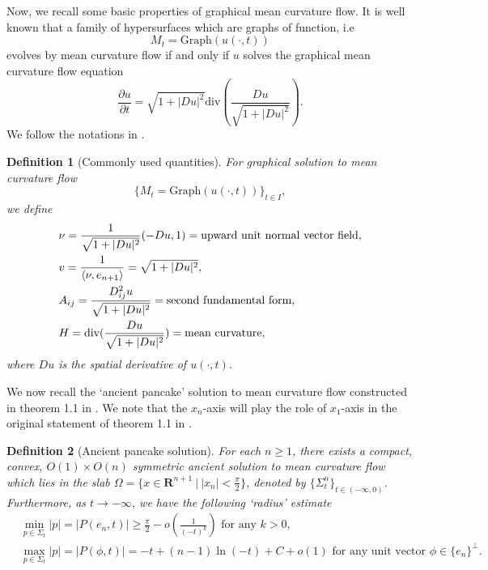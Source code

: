 \documentclass[pdflatex,sn-mathphys-num]{sn-jnl}%
\newtheorem{definition}{Definition}[section]
\begin{document}
Now, we recall some basic properties of graphical mean curvature flow. It is well known that a family of hypersurfaces which are graphs of function, i.e
\begin{equation}
    M_t = \text{Graph}(u(\cdot, t))
\end{equation}
evolves by mean curvature flow if and only if $u$ solves the graphical mean curvature flow equation
\begin{equation}
    \frac{\partial u}{\partial t} = \sqrt{1 + |Du|^2}\text{div}(\frac{Du}{\sqrt{1 + |Du|^2}}).
\end{equation}
We follow the notations in \cite{eckerhuisken}.
\begin{definition}[Commonly used quantities]\label{def of commonly used quantities}
For graphical solution to mean curvature flow
\begin{equation}
    \{M_t =\text{Graph}(u(\cdot, t))\}_{t \in I},
\end{equation}
we define
\begin{align*}
    &\nu = \frac{1}{\sqrt{1 + |Du|^2}}(-Du, 1) = \text{upward unit normal vector field},\\
    &v = \frac{1}{\langle \nu, e_{n+1}\rangle } = \sqrt{1 + |Du|^2}, \\
    &A_{ij} = \frac{D^2_{ij}u}{\sqrt{1 + |Du|^2}} = \text{second fundamental form}, \\ & H = \textit{\emph{div}}(\frac{Du}{\sqrt{1 +|Du|^2}}) = \text{mean curvature},
\end{align*}
where $Du$ is the spatial derivative of $u(\cdot, t)$. 
\end{definition}
We now recall the `ancient pancake' solution to mean curvature flow constructed in theorem 1.1 in \cite{ancientpancake}. We note that the $x_n$-axis will play the role of $x_1$-axis in the original statement of theorem 1.1 in \cite{ancientpancake}.
\begin{definition}[Ancient pancake solution]\label{def of ancient pancake}
For each $n \geq 1$, there exists a compact, convex, $O(1)\times O(n)$ symmetric ancient solution to mean curvature flow which lies in the slab
$\Omega = \{x \in \mathbf{R}^{n+1}\ 
 |\ |x_n| < \frac{\pi}{2}\}$, denoted by $\{\Sigma^n_t\}_{t \in (-\infty, 0)}$. Furthermore, as $t \to -\infty$, we have the following `radius' estimate
\begin{align}\label{model pancake asymptotic data}
   & \min_{p \in \Sigma_t}|p| = |P(e_n, t)| \geq \frac{\pi}{2} - o(\frac{1}{(-t)^k}) \text{ for any }k > 0, \\ &\max_{p \in \Sigma_t}|p| = |P(\phi, t)| = -t + (n-1)\ln(-t) + C + o(1) \text{ for any unit vector $\phi \in \{e_n\}^{\perp}$.} 
\end{align}
\end{definition}
\end{document}
